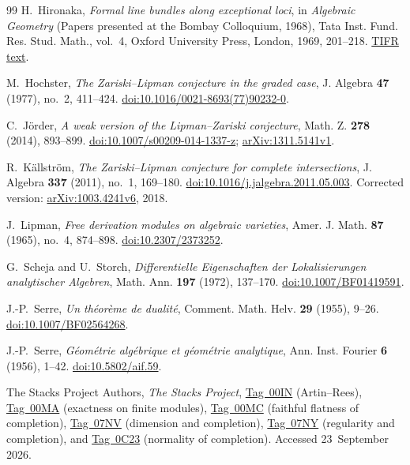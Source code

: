 \begin{thebibliography}{99}
H.~Hironaka,
\emph{Formal line bundles along exceptional loci},
in \emph{Algebraic Geometry} (Papers presented at the Bombay Colloquium, 1968),
Tata Inst. Fund. Res. Stud. Math., vol.~4,
Oxford University Press, London, 1969, 201--218.
\href{https://mathweb.tifr.res.in/Documents/Publications/Studies/SM_04-Algebraic-Geometry.pdf}{TIFR text}.

M.~Hochster,
\emph{The Zariski--Lipman conjecture in the graded case},
J. Algebra \textbf{47} (1977), no.~2, 411--424.
\href{https://doi.org/10.1016/0021-8693(77)90232-0}{doi:10.1016/0021-8693(77)90232-0}.

C.~J\"order,
\emph{A weak version of the Lipman--Zariski conjecture},
Math. Z. \textbf{278} (2014), 893--899.
\href{https://doi.org/10.1007/s00209-014-1337-z}{doi:10.1007/s00209-014-1337-z};
\href{https://arxiv.org/abs/1311.5141v1}{arXiv:1311.5141v1}.

R.~K\"allstr\"om,
\emph{The Zariski--Lipman conjecture for complete intersections},
J. Algebra \textbf{337} (2011), no.~1, 169--180.
\href{https://doi.org/10.1016/j.jalgebra.2011.05.003}{doi:10.1016/j.jalgebra.2011.05.003}.
Corrected version: \href{https://arxiv.org/abs/1003.4241v6}{arXiv:1003.4241v6}, 2018.

J.~Lipman,
\emph{Free derivation modules on algebraic varieties},
Amer. J. Math. \textbf{87} (1965), no.~4, 874--898.
\href{https://doi.org/10.2307/2373252}{doi:10.2307/2373252}.

G.~Scheja and U.~Storch,
\emph{Differentielle Eigenschaften der Lokalisierungen analytischer Algebren},
Math. Ann. \textbf{197} (1972), 137--170.
\href{https://doi.org/10.1007/BF01419591}{doi:10.1007/BF01419591}.

J.-P.~Serre,
\emph{Un th\'eor\`eme de dualit\'e},
Comment. Math. Helv. \textbf{29} (1955), 9--26.
\href{https://doi.org/10.1007/BF02564268}{doi:10.1007/BF02564268}.

J.-P.~Serre,
\emph{G\'eom\'etrie alg\'ebrique et g\'eom\'etrie analytique},
Ann. Inst. Fourier \textbf{6} (1956), 1--42.
\href{https://doi.org/10.5802/aif.59}{doi:10.5802/aif.59}.

The Stacks Project Authors,
\emph{The Stacks Project},
\href{https://stacks.math.columbia.edu/tag/00IN}{Tag~00IN}
(Artin--Rees),
\href{https://stacks.math.columbia.edu/tag/00MA}{Tag~00MA}
(exactness on finite modules),
\href{https://stacks.math.columbia.edu/tag/00MC}{Tag~00MC}
(faithful flatness of completion),
\href{https://stacks.math.columbia.edu/tag/07NV}{Tag~07NV}
(dimension and completion),
\href{https://stacks.math.columbia.edu/tag/07NY}{Tag~07NY}
(regularity and completion), and
\href{https://stacks.math.columbia.edu/tag/0C23}{Tag~0C23}
(normality of completion).
Accessed 23~September 2026.


\end{thebibliography}
